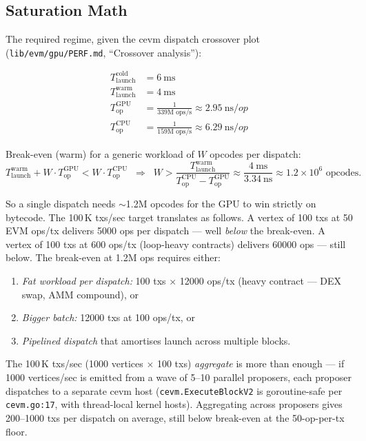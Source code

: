 \subsection{Saturation Math}
\label{sec:cevm-saturation}

The required regime, given the cevm dispatch crossover plot
(\texttt{lib/evm/gpu/PERF.md}, ``Crossover analysis''):

\begin{align*}
T_{\text{launch}}^{\text{cold}} &= \SI{6}{\milli\second} \\
T_{\text{launch}}^{\text{warm}} &= \SI{4}{\milli\second} \\
T_{\text{op}}^{\text{GPU}} &= \frac{1}{339\text{M ops/s}} \approx \SI{2.95}{\nano\second/op} \\
T_{\text{op}}^{\text{CPU}} &= \frac{1}{159\text{M ops/s}} \approx \SI{6.29}{\nano\second/op}
\end{align*}

Break-even (warm) for a generic workload of $W$ opcodes per dispatch:
\[
T_{\text{launch}}^{\text{warm}} + W \cdot T_{\text{op}}^{\text{GPU}}
< W \cdot T_{\text{op}}^{\text{CPU}}
\;\;\Rightarrow\;\;
W > \frac{T_{\text{launch}}^{\text{warm}}}{T_{\text{op}}^{\text{CPU}} - T_{\text{op}}^{\text{GPU}}}
\approx \frac{\SI{4}{\milli\second}}{\SI{3.34}{\nano\second}}
\approx 1.2 \times 10^{6} \text{ opcodes}.
\]

So a single dispatch needs $\sim$\num{1.2}M opcodes for the GPU to win
strictly on bytecode. The 100\,K txs/sec target translates as follows.
A vertex of 100 txs at 50 EVM ops/tx delivers \num{5000} ops per
dispatch --- well \emph{below} the break-even. A vertex of 100 txs at
\num{600} ops/tx (loop-heavy contracts) delivers \num{60000} ops ---
still below. The break-even at \num{1.2}M ops requires either:

\begin{enumerate}
  \item \emph{Fat workload per dispatch:} 100 txs $\times$ \num{12000}
    ops/tx (heavy contract --- DEX swap, AMM compound), or
  \item \emph{Bigger batch:} \num{12000} txs at \num{100} ops/tx, or
  \item \emph{Pipelined dispatch} that amortises launch across multiple
    blocks.
\end{enumerate}

The 100\,K txs/sec (\num{1000} vertices $\times$ \num{100} txs)
\emph{aggregate} is more than enough --- if 1000 vertices/sec is
emitted from a wave of 5--10 parallel proposers, each proposer dispatches
to a separate cevm host (\texttt{cevm.ExecuteBlockV2} is
goroutine-safe per \texttt{cevm.go:17}, with thread-local kernel
hosts). Aggregating across proposers gives \num{200}--\num{1000} txs per
dispatch on average, still below break-even at the \num{50}-op-per-tx
floor.

